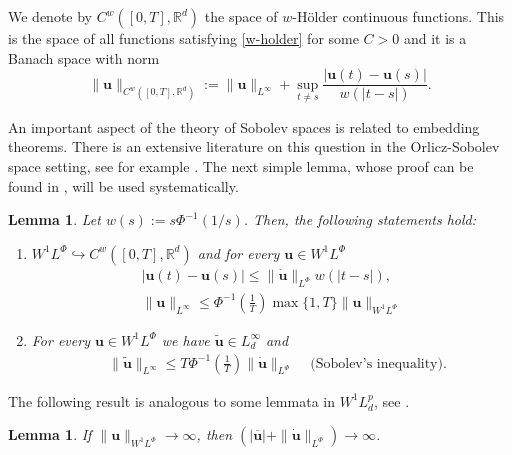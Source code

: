\documentclass[twoside]{article}
\newtheorem{lem}[thm]{Lemma}
\theoremstyle{remark}
\newcommand{\orlnor}{\|_{L^{\Phi}}}
\newcommand{\lphi}{L^{\Phi}}
\newcommand{\wphi}{W^{1}\lphi}
\newcommand{\sobnor}{\|_{W^{1}\lphi}}
\renewcommand{\b}[1]{\boldsymbol{#1}}
\newcommand{\rr}{\mathbb{R}}
\renewcommand{\leq}{\leqslant}
\begin{document}
We denote by $C^w([0,T],\rr^d)$  the space of  $w$-H\"older continuous functions. This is the space of all functions satisfying \eqref{w-holder} for some $C>0$ and it is a Banach space with norm
\[\|\b{u}\|_{  C^w([0,T],\rr^d) }  :=\|\b{u}\|_{L^{\infty}}+\sup\limits_{t\neq s}\frac{|\b{u}(t)-\b{u}(s)|}{w(|t-s|)}.\]





 An important aspect of the theory of Sobolev spaces is related to embedding theorems. There is an extensive literature on this question in the  Orlicz-Sobolev space setting, see for example
 \cite{cianchi2000fully,cianchi1999some,claverooptimal,edmunds2000optimal,kerman2006optimal}.
The next simple lemma, whose proof can be found in \cite{ABGMS2015}, will be used systematically.




\begin{lem}\label{inclusion orlicz} Let  $w(s):= s\Phi^{-1}(1/s)$. Then, the following statements hold:
\begin{enumerate}
\item\label{inclusion orlicz_item1} $\wphi\hookrightarrow C^w([0,T],\rr^d) $ and for every $\b{u}\in\wphi$
\begin{align}
 &\left|\b{u}(t)-\b{u}(s) \right| \leq  \|\b{\dot{u}}\orlnor w(| t-s|),&\label{in-sob-cont}
\\
& \|\b{u}\|_{L^{\infty}} \leq\Phi^{-1}\left(\frac{1}{T}\right)\max\{1,T\}\|\b{u}\sobnor&\label{sobolev}
\end{align}
\item For every $\b{u}\in\wphi$ we have $\widetilde{\b{u}}\in L^{\infty}_d$ and 
\begin{align}
& \|\widetilde{\b{u}}\|_{L^{\infty}} \leq T\Phi^{-1}\left(\frac{1}{T}\right)\|\b{\dot u}\orlnor&\text{  (Sobolev's inequality).}\label{wirtinger}
\end{align}




\end{enumerate}
\end{lem}


The following result is analogous to some lemmata in $W^1L^p_d$, see \cite{xu2007some}.
\begin{lem}\label{infinito-a-prom-upunto}
If $\|\b{u}\sobnor\to \infty$, then $(|\b{\overline u}|+\|\b{\dot u}\orlnor)\to \infty$.
\end{lem}
\end{document}
